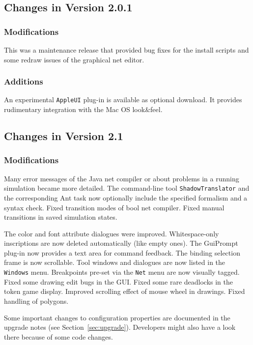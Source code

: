 \subsection{Changes in Version 2.0.1}

\subsubsection*{Modifications}

This was a maintenance release that provided
bug fixes for the install scripts 
and some redraw issues of the graphical net editor.

\subsubsection*{Additions}

An experimental \texttt{AppleUI} plug-in is available as optional
download. It provides rudimentary integration with the Mac OS look\&feel.

\subsection{Changes in Version 2.1}

\subsubsection*{Modifications}

Many error messages of the Java net compiler or about problems in a running
simulation became more detailed.
The command-line tool \texttt{ShadowTranslator} and the corresponding Ant
task now optionally include the specified formalism and a syntax check.
Fixed transition modes of bool net compiler.
Fixed manual transitions in saved simulation states.

The color and font attribute dialogues were improved.
Whitespace-only inscriptions are now deleted automatically (like empty
ones).
The GuiPrompt plug-in now provides a text area for command feedback.
The binding selection frame is now scrollable.
Tool windows and dialogues are now listed in the \texttt{Windows} menu.
Breakpoints pre-set via the \texttt{Net} menu are now visually tagged.
Fixed some drawing edit bugs in the GUI.
Fixed some rare deadlocks in the token game display.
Improved scrolling effect of mouse wheel in drawings.
Fixed handling of polygons.

Some important changes to configuration properties are documented in the
upgrade notes (see Section~\ref{sec:upgrade}).
Developers might also have a look there because of some code changes.

